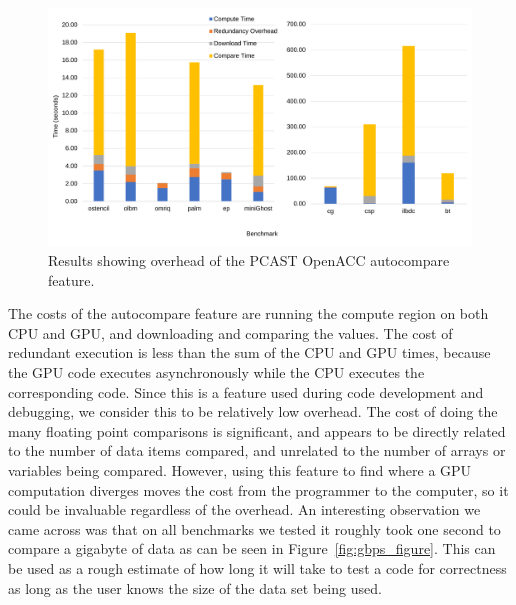 
\begin{figure}[t]
    \centering
    \includegraphics [width=1\linewidth] {npic3.pdf}
    \caption{Results showing overhead of the PCAST OpenACC autocompare feature.}
    \label{fig:sle_figure}
\end{figure}


The costs of the autocompare feature are running the compute region on both CPU and GPU, and downloading and comparing the values.
The cost of redundant execution is less than the sum of the CPU and GPU times, because the GPU code executes asynchronously while the CPU executes the corresponding code.
Since this is a feature used during code development and debugging, we consider this to be relatively low overhead.
The cost of doing the many floating point comparisons is significant, and appears to be directly related to the number of data items compared, and unrelated to the number of arrays or variables being compared.
However, using this feature to find where a GPU computation diverges moves the cost from the programmer to the computer, so it could be invaluable regardless of the overhead. An interesting observation we came across was that on all benchmarks we tested it roughly took one second to compare a gigabyte of data as can be seen in Figure~\ref{fig:gbps_figure}.
This can be used as a rough estimate of how long it will take to test a code for correctness as long as the user knows the size of the data set being used.

